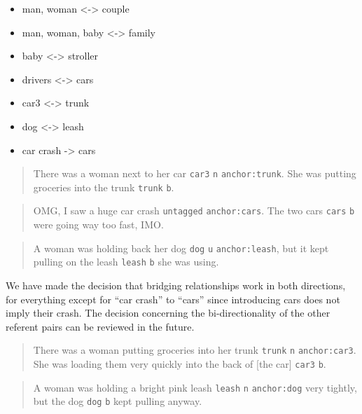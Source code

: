 \documentclass[
]{book}
\providecommand{\tightlist}{%
  \setlength{\itemsep}{0pt}\setlength{\parskip}{0pt}}
\begin{document}
\begin{itemize}
\tightlist
\item
  man, woman \textless-\textgreater{} couple
\item
  man, woman, baby \textless-\textgreater{} family
\item
  baby \textless-\textgreater{} stroller
\item
  drivers \textless-\textgreater{} cars
\item
  car3 \textless-\textgreater{} trunk
\item
  dog \textless-\textgreater{} leash
\item
  car crash -\textgreater{} cars
\end{itemize}

\begin{quote}
There was a woman next to her car \texttt{car3} \texttt{n} \texttt{anchor:trunk}.
She was putting groceries into the trunk \texttt{trunk} \texttt{b}.
\end{quote}

\begin{quote}
OMG, I saw a huge car crash \texttt{untagged} \texttt{anchor:cars}.
The two cars \texttt{cars} \texttt{b} were going way too fast, IMO.
\end{quote}

\begin{quote}
A woman was holding back her dog \texttt{dog} \texttt{u} \texttt{anchor:leash},
but it kept pulling on the leash \texttt{leash} \texttt{b} she was using.
\end{quote}

We have made the decision that bridging relationships work in both directions,
for everything except for ``car crash'' to ``cars'' since introducing cars does not imply their crash.
The decision concerning the bi-directionality of the other referent pairs can be reviewed in the future.

\begin{quote}
There was a woman putting groceries into her trunk \texttt{trunk} \texttt{n} \texttt{anchor:car3}.
She was loading them very quickly into the back of {[}the car{]} \texttt{car3} \texttt{b}.
\end{quote}

\begin{quote}
A woman was holding a bright pink leash \texttt{leash} \texttt{n} \texttt{anchor:dog} very tightly,
but the dog \texttt{dog} \texttt{b} kept pulling anyway.
\end{quote}
\end{document}

